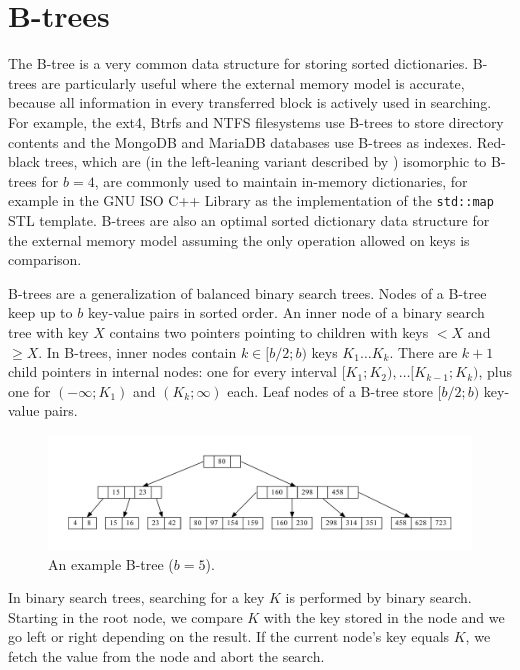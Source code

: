 \chapter{B-trees}
\label{chapter:btree}
The B-tree is a very common data structure for storing sorted dictionaries.
B-trees are particularly useful where the external memory model is accurate,
because all information in every transferred block is actively used
in searching. For example, the ext4, Btrfs and NTFS filesystems use B-trees
to store directory contents and the MongoDB and MariaDB databases use B-trees
as indexes. Red-black trees, which are (in the left-leaning variant
described by \cite{left-leaning}) isomorphic to B-trees for $b=4$, are
commonly used to maintain in-memory dictionaries, for example in the GNU ISO
C++ Library as the implementation of the \texttt{std::map} STL template.
B-trees are also an optimal sorted dictionary data structure
for the external memory model assuming the only operation allowed on
keys is comparison.

B-trees are a generalization of balanced binary search trees.
Nodes of a B-tree keep up to $b$ key-value pairs in sorted order.
An inner node of a binary search tree with key $X$ contains two pointers
pointing to children with keys $< X$ and $\geq X$. In B-trees,
inner nodes contain $k\in[b/2;b)$ keys $K_1\ldots K_k$. There are $k+1$
child pointers in internal nodes: one for every interval
$[K_1;K_2),\ldots [K_{k-1};K_k)$, plus one for $(-\infty;K_1)$ and
$(K_k;\infty)$ each.
Leaf nodes of a B-tree store $[b/2;b)$ key-value pairs.

\begin{figure}
\centering
\includegraphics[width=\linewidth]{img/btree}
\caption{An example B-tree ($b=5$).}
\end{figure}

In binary search trees, searching for a key $K$ is performed by binary search.
Starting in the root node, we compare $K$ with the key stored in the node
and we go left or right depending on the result. If the current node's key
equals $K$, we fetch the value from the node and abort the search.

